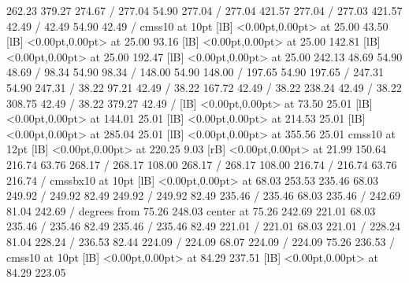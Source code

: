 { 262.23 379.27 274.67 /
\setsolid
{} 277.04 54.90 277.04 /
 277.04 421.57 277.04 /
 277.03 421.57 42.49 /
 42.49 54.90 42.49 /
\font\picfont cmss10 at 10pt\picfont
{}  [lB] <0.00pt,0.00pt> at 25.00 43.50
  [lB] <0.00pt,0.00pt> at 25.00 93.16
  [lB] <0.00pt,0.00pt> at 25.00 142.81
  [lB] <0.00pt,0.00pt> at 25.00 192.47
  [lB] <0.00pt,0.00pt> at 25.00 242.13
\setsolid
{} 48.69 54.90 48.69 /
\setsolid
{} 98.34 54.90 98.34 /
\setsolid
{} 148.00 54.90 148.00 /
\setsolid
{} 197.65 54.90 197.65 /
\setsolid
{} 247.31 54.90 247.31 /
\setsolid
{} 38.22 97.21 42.49 /
\setsolid
{} 38.22 167.72 42.49 /
\setsolid
{} 38.22 238.24 42.49 /
\setsolid
{} 38.22 308.75 42.49 /
\setsolid
{} 38.22 379.27 42.49 /
  [lB] <0.00pt,0.00pt> at 73.50 25.01
  [lB] <0.00pt,0.00pt> at 144.01 25.01
  [lB] <0.00pt,0.00pt> at 214.53 25.01
  [lB] <0.00pt,0.00pt> at 285.04 25.01
  [lB] <0.00pt,0.00pt> at 355.56 25.01
\font\picfont cmss10 at 12pt\picfont
{}  [lB] <0.00pt,0.00pt> at 220.25 9.03
 [rB] <0.00pt,0.00pt> at 21.99 150.64
\setsolid
{} 216.74 63.76 268.17 /
 268.17 108.00 268.17 /
 268.17 108.00 216.74 /
 216.74 63.76 216.74 /
\font\picfont cmssbx10 at 10pt\picfont
{}  [lB] <0.00pt,0.00pt> at 68.03 253.53
\setsolid
{} 235.46 68.03 249.92 /
 249.92 82.49 249.92 /
 249.92 82.49 235.46 /
 235.46 68.03 235.46 /
\setsolid
{} 242.69 81.04 242.69 /
 degrees from 75.26 248.03 center at 75.26 242.69
\setsolid
{} 221.01 68.03 235.46 /
 235.46 82.49 235.46 /
 235.46 82.49 221.01 /
 221.01 68.03 221.01 /
\setsolid
{} 228.24 81.04 228.24 /
\setsolid
{} 236.53 82.44 224.09 /
 224.09 68.07 224.09 /
 224.09 75.26 236.53 /
\font\picfont cmss10 at 10pt\picfont
{}  [lB] <0.00pt,0.00pt> at 84.29 237.51
  [lB] <0.00pt,0.00pt> at 84.29 223.05
\endpicture
}
